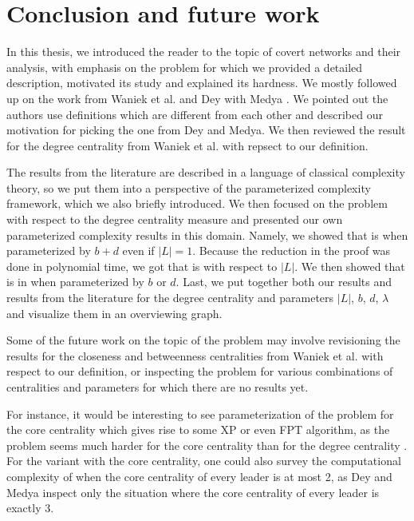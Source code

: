 \chapter{Conclusion and future work}

In this thesis, we introduced the reader to the topic of covert networks and their analysis,
with emphasis on the \HL problem for which we provided a detailed description, motivated its study
and explained its hardness.
We mostly followed up on the work from Waniek et al. and Dey with Medya \cite{Waniek2017,Dey2019}.
We pointed out the authors use definitions which are different from each other and described our motivation
for picking the one from Dey and Medya.
We then reviewed the result for the degree centrality from Waniek et al. with repsect to our definition.

The results from the literature are described in a language of classical complexity theory,
so we put them into a perspective of the parameterized complexity framework, which we also briefly introduced.
We then focused on the problem with respect to the degree centrality measure
and presented our own parameterized complexity results in this domain.
Namely, we showed that \HL is \Wh when parameterized by $b+d$ even if $|L| = 1$.
Because the reduction in the proof was done in polynomial time,
we got that \HLshort is \pNPh with respect to $|L|$.
We then showed that \HLshort is in \XP when parameterized by $b$ or $d$.
Last, we put together both our results and results from the literature for the degree centrality
and parameters $|L|$, $b$, $d$, $\lambda$ and visualize them in an overviewing graph.

Some of the future work on the topic of the \HL problem may involve
revisioning the results for the closeness and betweenness centralities from Waniek et al. \cite{Waniek2021full}
with respect to our definition,
or inspecting the problem for various combinations of centralities and parameters for which there are no results yet.

For instance, it would be interesting to see parameterization of the problem for the core centrality
which gives rise to some XP or even FPT algorithm,
as the problem seems much harder for the core centrality than for the degree centrality \cite{Dey2019}.
For the variant with the core centrality, one could also survey the computational complexity of \HLshort
when the core centrality of every leader is at most 2,
as Dey and Medya \cite{Dey2019} inspect only the situation where the core centrality of every leader is exactly 3.


